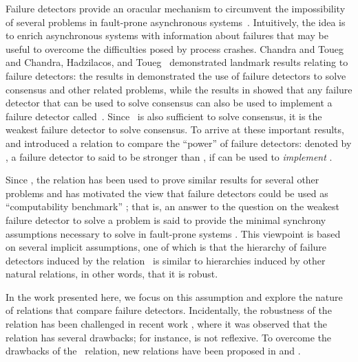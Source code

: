 \documentclass[11pt]{article}
\begin{document}
Failure detectors \cite{chan:ufdfr} provide an oracular mechanism to
     circumvent  the impossibility of several problems in fault-prone
     asynchronous systems~\cite{FLP,fich:03:hirdc}.
Intuitively, the idea is to enrich asynchronous systems with
     information about failures that may be useful to overcome the
     difficulties posed by process crashes.
Chandra and Toueg~\cite{chan:ufdfr} and Chandra, Hadzilacos, and
     Toueg~\cite{chan:twfdf1} demonstrated landmark results relating to failure detectors: the results in \cite{chan:ufdfr} demonstrated the use of failure
     detectors to solve consensus and other related problems, while
     the results in \cite{chan:twfdf1} showed that any failure
     detector that can be used to solve consensus can also be used to
     implement a failure detector called~.
Since~ is also sufficient to solve consensus, it is the
     weakest failure detector to solve consensus.
To arrive at these important results, \cite{chan:ufdfr} and
     \cite{chan:twfdf1} introduced a relation to compare the ``power''
     of failure detectors: denoted by , a failure detector  to said to be
     stronger than , if  can be used to \emph{implement}
     .
     
Since \cite{chan:twfdf1}, the relation  has been used to prove
     similar results for several other problems and has motivated the
     view that failure detectors could be used as ``computability
     benchmark'' \cite{FGK11}; that is, an answer to the question on
     the weakest failure detector  to solve a problem  is
     said  to provide the minimal synchrony assumptions necessary to
     solve  in fault-prone systems \cite{chan:twfdf1,FGK11}.
This viewpoint is based on several implicit assumptions, one of which
     is that the  hierarchy of failure detectors induced by the
     relation~ is similar to hierarchies induced by other
     natural relations, in other words, that it is robust.


In the work presented here, we focus on this assumption and explore
     the nature of relations that compare failure detectors.
Incidentally, the robustness of the  relation has been
     challenged in recent work
     \cite{jayanti:ephawfd,charron-bost:10:isolt,cornejoetalAFD,cornejoetalAFD-TR}, where it was
     observed that the relation has several drawbacks; for instance,
      is not reflexive.
To overcome the drawbacks of the~ relation, new relations have
     been proposed in \cite{jayanti:ephawfd} and
     \cite{charron-bost:10:isolt}.
\end{document}
